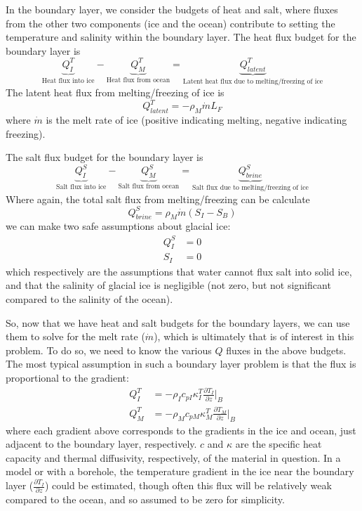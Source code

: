 \documentclass[12pt]{article}
\theoremstyle{definition}
\newcommand{\pd}[2]{\frac{\partial {#1}}{\partial {#2}}}
\begin{document}
In the boundary layer, we consider the budgets of heat and salt, where fluxes from the other two components (ice and the ocean) contribute to setting the temperature and salinity within the boundary layer. The heat flux budget for the boundary layer is
\begin{equation}
\label{eq:Hflux}
\underbrace{Q_I^T}_{\text{Heat flux into ice}} - \underbrace{Q_M^T}_{\text{Heat flux from ocean}} = \underbrace{Q_{latent}^T}_{\text{Latent heat flux due to melting/freezing of ice}}
\end{equation}
The latent heat flux from melting/freezing of ice is
\begin{equation} Q_{latent}^T = -\rho_M \dot{m} L_F \end{equation}
where $\dot{m}$ is the melt rate of ice (positive indicating melting, negative indicating freezing).

The salt flux budget for the boundary layer is
\begin{equation}
\label{eq:Sflux}
\underbrace{Q_I^S}_{\text{Salt flux into ice}} - \underbrace{Q_M^S}_{\text{Salt flux from ocean}} = \underbrace{Q_{brine}^S}_{\text{Salt flux due to melting/freezing of ice}}
\end{equation}
Where again, the total salt flux from melting/freezing can be calculate
\begin{equation} Q_{brine}^S = \rho_M \dot{m} (S_I - S_B) \end{equation}
we can make two safe assumptions about glacial ice:
\begin{align}
Q_I^S &= 0 \\
S_I &= 0
\end{align}
which respectively are the assumptions that water cannot flux salt into solid ice, and that the salinity of glacial ice is negligible (not zero, but not significant compared to the salinity of the ocean).

So, now that we have heat and salt budgets for the boundary layers, we can use them to solve for the melt rate ($\dot{m}$), which is ultimately that is of interest in this problem. To do so, we need to know the various $Q$ fluxes in the above budgets. The most typical assumption in such a boundary layer problem is that the flux is proportional to the gradient:
\begin{align}
Q_I^T &= -\rho_I c_{pI} \kappa _I^T \pd{T_I}{z} \big|_B \\
Q_M^T &= -\rho_M c_{pM} \kappa _M^T \pd{T_M}{z} \big|_B
\end{align}
where each gradient above corresponds to the gradients in the ice and ocean, just adjacent to the boundary layer, respectively. $c$ and $\kappa$ are the specific heat capacity and thermal diffusivity, respectively, of the material in question. In a model or with a borehole, the temperature gradient in the ice near the boundary layer ($\pd{T_I}{z}$) could be estimated, though often this flux will be relatively weak compared to the ocean, and so assumed to be zero for simplicity.
\end{document}
